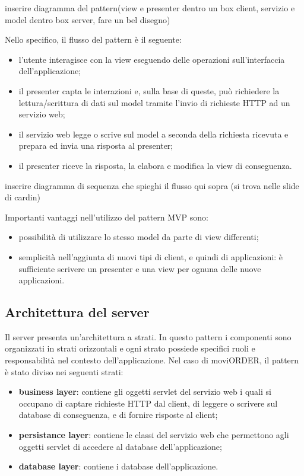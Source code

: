 inserire diagramma del pattern(view e presenter dentro un box client, servizio e model dentro box server, fare un bel disegno)

Nello specifico, il flusso del pattern è il seguente:
\begin{itemize}
	\item l'utente interagisce con la view eseguendo delle operazioni sull'interfaccia dell'applicazione;
	\item il presenter capta le interazioni e, sulla base di queste, può richiedere la lettura/scrittura di dati sul model tramite l'invio di richieste HTTP ad un servizio web;
	\item il servizio web legge o scrive sul model a seconda della richiesta ricevuta e prepara ed invia una risposta al presenter;
	\item il presenter riceve la risposta, la elabora e modifica la view di conseguenza.
\end{itemize}

inserire diagramma di sequenza che spieghi il flusso qui sopra (si trova nelle slide di cardin)

Importanti vantaggi nell'utilizzo del pattern MVP sono:
\begin{itemize}
	\item possibilità di utilizzare lo stesso model da parte di view differenti;
	\item semplicità nell'aggiunta di nuovi tipi di client, e quindi di applicazioni: è sufficiente scrivere un presenter e una view per ognuna delle nuove applicazioni.
\end{itemize}

\subsection{Architettura del server}

Il server presenta un'architettura a strati. In questo pattern i componenti sono organizzati in strati orizzontali e ogni strato possiede specifici ruoli e responsabilità nel contesto dell'applicazione. Nel caso di moviORDER, il pattern è stato diviso nei seguenti strati:
\begin{itemize}
	\item \textbf{business layer}: contiene gli oggetti servlet del servizio web i quali si occupano di captare richieste HTTP dal client, di leggere o scrivere sul database di conseguenza, e di fornire risposte al client;
	\item \textbf{persistance layer}: contiene le classi del servizio web che permettono agli oggetti servlet di accedere al database dell'applicazione;
	\item \textbf{database layer}: contiene i database dell'applicazione.
\end{itemize}

